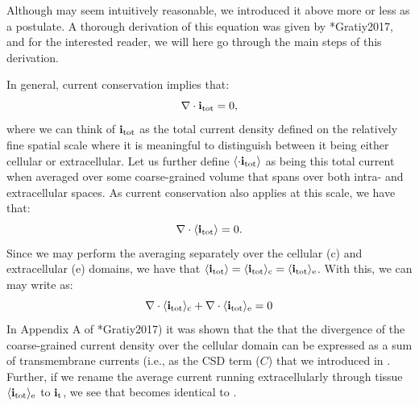 \subsubsection{}
\label{sec:Basics:C2}
Although   may seem intuitively reasonable, we introduced it above more or less as a postulate. A thorough derivation of this equation was given by \citeasnoun**{Gratiy2017}, and for the interested reader, we will here go through the main steps of this derivation. 

In general, current conservation implies that: 
\begin{equation}
{\bf \nabla} \cdot {\bf i}_\text{tot} = 0, 
\label{eq:Basics:Sergey1}
\end{equation}
where we can think of ${\bf i}_\text{tot}$ as the total current density defined on the relatively fine spatial scale where it is meaningful to distinguish between it being either cellular or extracellular. Let us further define $\left<\cdot {\bf i}_\text{tot}\right>$ as being this total current when averaged over some coarse-grained volume that spans over both intra- and extracellular spaces. 
As current conservation also applies at this scale, we have that: 
\begin{equation}
{\bf \nabla} \cdot \langle{\bf i}_\text{tot}\rangle = 0.
\label{eq:Basics:Sergey2}
\end{equation}
Since we may perform the averaging separately over the cellular (c) and extracellular (e) domains, we have that $\langle{\bf i}_\text{tot}\rangle = \langle{\bf i}_\text{tot}\rangle_\text{c} = \langle{\bf i}_\text{tot}\rangle_\text{e}$. With this, we can may write  as:
\begin{equation}
{\bf \nabla} \cdot \langle{\bf i}_\text{tot}\rangle_\text{c}  + {\bf \nabla}\cdot \langle{\bf i}_\text{tot}\rangle_\text{e} = 0
\label{eq:Basics:Sergey3}
\end{equation}
In Appendix A of \citeasnoun**{Gratiy2017}) it was shown that the that the divergence of the coarse-grained current density over the cellular domain can be expressed as a sum of transmembrane currents (i.e., as the CSD term ($C$) that we introduced in . Further, if we rename the average current running extracellularly through tissue $\langle{\bf i}_\text{tot}\rangle_\text{e}$ to ${\bf i}_\text{t}$, we see that  becomes identical to  . 

